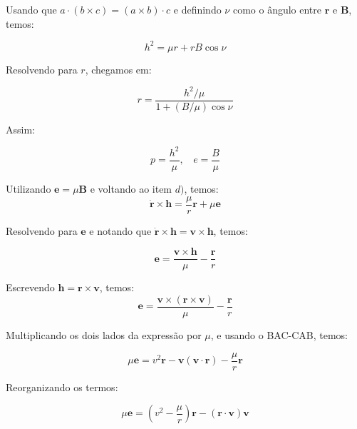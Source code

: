 \documentclass[11pt]{article}
\begin{document}
\begin{pproblem}
\begin{pssolution*}{}{}
\begin{alternativas}
            Usando que \(a\cdot(b\times c) = (a\times b)\cdot c\) e definindo \(\nu\) como o ângulo entre \(\mathbf{r}\) e \(\mathbf{B}\), temos:

            \[h^2 = \mu r + rB\cos\nu\]

            Resolvendo para \(r\), chegamos em:

            \[r = \frac{h^2/\mu}{1+(B/\mu)\cos\nu}\]

            Assim:

            \[\boxed{p = \frac{h^2}{\mu}, \ \ \ \ e = \frac{B}{\mu}}\]

            \item Utilizando \(\mathbf{e} = \mu \mathbf{B}\) e voltando ao item \(d)\), temos:
            \[\dot{\mathbf{r}}\times \mathbf{h} = \frac{\mu}{r}\mathbf{r}+\mu \mathbf{e}\]

            Resolvendo para \(\mathbf{e}\) e notando que \(\dot{\mathbf{r}}\times\mathbf{h} = \mathbf{v}\times\mathbf{h}\), temos:

            \[\boxed{\mathbf{e} = \frac{\mathbf{v}\times\mathbf{h}}{\mu} - \frac{\mathbf{r}}{r}}\]

            \item Escrevendo \(\mathbf{h} = \mathbf{r}\times\mathbf{v}\), temos:
            \[\mathbf{e} = \frac{\mathbf{v}\times(\mathbf{r}\times\mathbf{v})}{\mu} - \frac{\mathbf{r}}{r} \]

            Multiplicando os dois lados da expressão por \(\mu\), e usando o BAC-CAB, temos:

            \[\mu\mathbf{e} = v^2\mathbf{r} - \mathbf{v}(\mathbf{v}\cdot\mathbf{r}) - \frac{\mu}{r}\mathbf{r}\]

            Reorganizando os termos:

            \[\boxed{\mu \mathbf{e} = (v^2-\frac{\mu}{r})\mathbf{r} - (\mathbf{r}\cdot\mathbf{v})\mathbf{v}}\]
        \end{alternativas}
    \end{pssolution*}
\end{pproblem}
\end{document}
